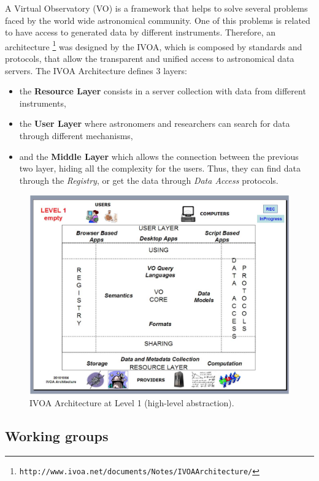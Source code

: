 A Virtual Observatory (VO) is a framework that helps to solve several
problems faced by the world wide astronomical community.
One of this problems is related to have access to generated data by
different instruments. Therefore, an architecture
\footnote{\texttt{http://www.ivoa.net/documents/Notes/IVOAArchitecture/}} was designed by the IVOA, which is composed by
standards and protocols, that allow the transparent
and unified access to astronomical data servers. The IVOA Architecture
defines 3 layers:
\begin{itemize}
        \item the \textbf{Resource Layer} consists in a server
collection with data from different instruments,
        \item the \textbf{User Layer} where astronomers and researchers can
search for data through different mechanisms,
        \item and the \textbf{Middle Layer} which allows the connection
between the previous two layer, hiding all the complexity for the
users. Thus, they can find data through the \emph{Registry}, or get the data
through \emph{Data Access} protocols.
\end{itemize}

\begin{figure}%
\begin{center}
	\includegraphics[width=0.9\linewidth]{img/ivoa_arch.png}
	\caption{IVOA Architecture at Level 1 (high-level abstraction).}
\end{center}
\label{figure:ivoarch}
\end{figure}

\subsection{Working groups}

